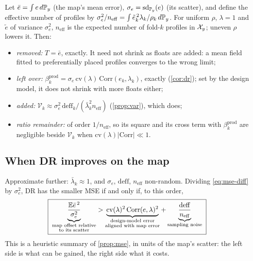 Let $\bar e=\int e\,d\mathbb{P}_y$ (the map's mean error), $\sigma_e=\operatorname{sd}_{\mathbb{P}_y}(e)$ (its scatter), and define
the effective number of profiles by $\sigma_e^2/n_{\mathrm{eff}}=\int\tilde e_k^{\,2}\lambda_k/\rho_k\,d\mathbb{P}_y$.
For uniform $\rho$, $\lambda=1$ and $\tilde e$ of variance $\sigma_e^2$, $n_{\mathrm{eff}}$ is the expected
number of fold-$k$ profiles in $\mathcal{X}_y$; uneven $\rho$ lowers it. Then:
\begin{itemize}
  \item \emph{removed:} $T=\bar e$, exactly. It need not shrink as floats are added: a mean field
        fitted to preferentially placed profiles converges to the wrong limit;
  \item \emph{left over:} $\beta^{\mathrm{prod}}_k=\sigma_e\,\mathrm{cv}(\lambda)\,\mathrm{Corr}(e_k,\lambda_k)$,
        exactly (\cref{cor:dr}); set by the design model, it does not shrink with more floats either;
  \item \emph{added:} $\mathcal V_k\approx\sigma_e^2\,\mathrm{deff}_k/(\bar\lambda_k^2n_{\mathrm{eff}})$
        (\cref{prop:var}), which does;
  \item \emph{ratio remainder:} of order $1/n_{\mathrm{eff}}$, so its square and its cross term with
        $\beta^{\mathrm{prod}}_k$ are negligible beside $\mathcal V_k$ when $\mathrm{cv}(\lambda)|\mathrm{Corr}|\ll1$.
\end{itemize}

\subsection{When DR improves on the map}

Approximate further: $\bar\lambda_k\approx1$, and $\sigma_e$, $\mathrm{deff}$, $n_{\mathrm{eff}}$ non-random.
Dividing \eqref{eq:mse-diff} by $\sigma_e^2$, DR has the smaller MSE if and only if, to this order,
\begin{equation}\label{eq:headline}
  \boxed{\;
  \underbrace{\frac{\mathbb{E}\bar e^{\,2}}{\sigma_e^2}}_{\substack{\text{map offset relative}\\\text{to its scatter}}}
  >\underbrace{\mathrm{cv}(\lambda)^2\,\mathrm{Corr}(e,\lambda)^2}_{\substack{\text{design-model error}\\\text{aligned with map error}}}
  +\underbrace{\frac{\mathrm{deff}}{n_{\mathrm{eff}}}}_{\text{sampling noise}}\;}
\end{equation}
This is a heuristic summary of \cref{prop:mse}, in units of the map's scatter: the left side is what
can be gained, the right side what it costs.

